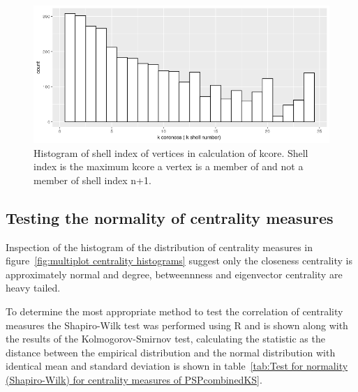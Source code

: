  
 
 \begin{figure}
     \centering
     \includegraphics[width=\textwidth]{images/Rplot01_kcore_hist.png}
     \caption{Histogram of shell index of vertices in calculation of kcore. Shell index is the maximum kcore a vertex is a member of and not a member of shell index n+1. }
     \label{fig:Kcore_histogram}
 \end{figure}
 

\subsection{Testing the normality of centrality measures}

Inspection of the histogram of the distribution of centrality measures in figure~\ref{fig:multiplot centrality histograms} suggest  only the closeness centrality is approximately normal and degree, betweennness and eigenvector centrality are heavy tailed. 




To determine the most appropriate method to test the correlation of centrality measures the Shapiro-Wilk test was performed using R and is shown along with the results of the Kolmogorov-Smirnov test, calculating the statistic as the distance between the empirical distribution and the normal distribution with identical mean and standard deviation is shown in table~\ref{tab:Test for normality (Shapiro-Wilk) for centrality measures of PSPcombinedKS}.

